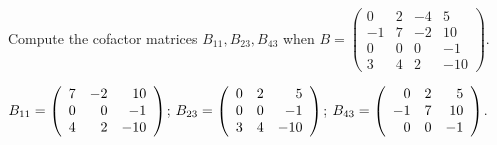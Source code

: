 \documentclass{ximera}
\begin{document}
\begin{exercise} \label{c10.1.b7b}
Compute the cofactor matrices $B_{11}, B_{23}, B_{43}$ when
$B = \left( \begin{array}{rrrr}
 0 & 2 & -4 & 5\\
 -1 & 7 & -2 & 10\\
 0 & 0 & 0  & -1\\
3 & 4 & 2 & -10
\end{array} \right)$.

\begin{solution}

$B_{11} = \left(\begin{array}{rrr} 7 & -2 & 10 \\ 0 & 0 & -1 \\ 4 & 2 & -10\end{array}\right)$;
$B_{23} = \left(\begin{array}{rrr} 0 & 2 & 5 \\ 0 & 0 & -1 \\ 3 & 4 & -10\end{array}\right)$;
$B_{43} = \left(\begin{array}{rrr} 0 & 2 & 5 \\ -1 & 7 & 10 \\ 0 & 0 & -1\end{array}\right)$.

\end{solution}
\end{exercise}
\end{document}
